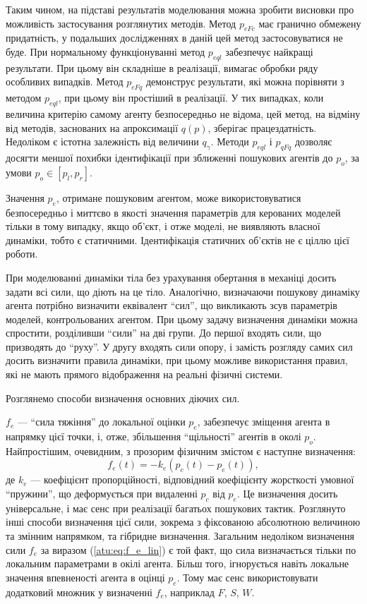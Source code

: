 \documentclass[a4paper,13pt]{atuaref}
\begin{document}
Таким чином, на підставі результатів моделювання можна зробити висновки про
можливість застосування розглянутих методів. Метод $p_{eFc}$ має гранично
обмежену придатність, у подальших дослідженнях в даній цей метод застосовуватися
не буде. При нормальному функціонуванні метод $p_{eql}$ забезпечує найкращі
результати. При цьому він складніше в реалізації, вимагає обробки ряду
особливих випадків. Метод $p_{eFq}$ демонструє результати, які можна
порівняти з методом $p_{eql}$, при цьому він простіший в реалізації. У тих
випадках, коли величина критерію самому агенту безпосередньо не відома, цей
метод, на відміну від методів, заснованих на апроксимації $q (p)$, зберігає
працездатність. Недоліком є істотна залежність від величини $q_\gamma$.
Методи $p_{eql}$ і $p_{qFq}$ дозволяє досягти меншої похибки
ідентифікації при зближенні пошукових агентів до $p_o$, за умови $p_o \in [p_l, p_r]$.



Значення $p_e$, отримане пошуковим агентом, може використовуватися
безпосередньо і миттєво в якості значення параметрів для керованих моделей
тільки в тому випадку, якщо об'єкт, і отже моделі, не виявляють власної
динаміки, тобто є статичними. Ідентифікація статичних об'єктів не є ціллю
цієї роботи.

При моделюванні динаміки тіла без урахування обертання в механіці досить задати
всі сили, що діють на це тіло. Аналогічно, визначаючи пошукову динаміку агента
потрібно визначити еквівалент ``сил'', що викликають зсув параметрів моделей,
контрольованих агентом. При цьому задачу визначення динаміки можна спростити,
розділивши ``сили'' на дві групи. До першої входять сили, що призводять до ``руху''.
У другу входять сили опору, і замість розгляду самих сил досить
визначити правила динаміки, при цьому можливе використання правил, які не мають
прямого відображення на реальні фізичні системи.

Розглянемо способи визначення основних діючих сил.

$f_e$ --- ``сила тяжіння'' до локальної оцінки $p_e$, забезпечує зміщення
агента в напрямку цієї точки, і, отже, збільшення ``щільності'' агентів в
околі $p_o$. Найпростішим, очевидним, з прозорим фізичним змістом є
наступне визначення:
%
\begin{equation}
  f_e(t) = - k_e \left( p_c(t) - p_e(t) \right)  ,
  \label{atu:eq:f_e_lin}
\end{equation}
%
де $k_e$ --- коефіцієнт пропорційності, відповідний коефіцієнту жорсткості
умовної ``пружини'', що деформується при видаленні $p_c$ від $p_e$. Це
визначення досить універсальне, і має сенс при реалізації багатьох пошукових
тактик. Розглянуто інші способи визначення цієї сили, зокрема з фіксованою
абсолютною величиною та змінним напрямком, та гібридне визначення.
Загальним недоліком визначення сили $f_e$ за виразом (\ref{atu:eq:f_e_lin})
є той факт, що сила визначається тільки по локальним параметрами в окілі
агента. Більш того, ігнорується навіть локальне значення впевненості агента в
оцінці $p_e$. Тому має сенс використовувати додатковий множник у визначенні $f_e$,
наприклад $F$, $S$, $W$.
\end{document}
